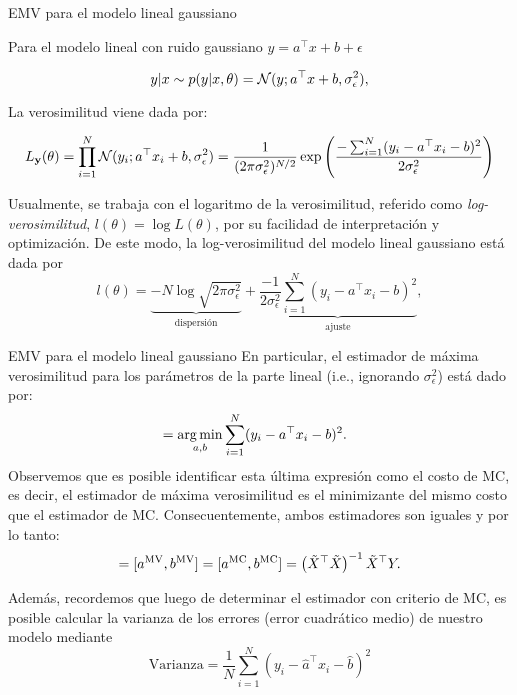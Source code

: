\documentclass[9pt]{beamer}
\begin{document}
\begin{frame}{EMV para el modelo lineal gaussiano}

Para el modelo lineal con ruido gaussiano $y=a^\top x + b + \epsilon$

\begin{equation*}
	y|x \sim p(y|x,\theta) = {\mathcal N}(y;a^\top x + b ,\sigma_\epsilon^2),\label{eq:mod_lin_gau}
\end{equation*}

La verosimilitud viene dada por:

\begin{equation*}
	L_{\mathbf{y}}(\theta) =  \prod_{i=1}^N {\mathcal N}(y_i;a^\top x_i + b,\sigma_\epsilon^2) = \frac{1}{(2\pi\sigma_\epsilon^2)^{N/2}}  \exp\left(\frac{-\sum_{i=1}^N(y_i-a^\top x_i - b)^2}{2\sigma_\epsilon^2}\right) \label{eq:verosimilitud_lineal}
\end{equation*}\pause

Usualmente, se trabaja con el logaritmo de la verosimilitud, referido como \emph{log-verosimilitud}, $l(\theta) = \log L(\theta)$, por su facilidad de interpretación y optimización. De este modo, la log-verosimilitud del modelo lineal gaussiano está dada por
\begin{equation*}
	l(\theta) 
		= \underbrace{-N\log \sqrt{2\pi\sigma^2_\epsilon}}_{\text{dispersión}} + \underbrace{\frac{-1}{2\sigma_\epsilon^2} \sum_{i=1}^N (y_i-a^\top x_i - b)^2}_{\text{ajuste}},
\end{equation*}
	
\end{frame}

\begin{frame}{EMV para el modelo lineal gaussiano}
	En particular, el estimador  de máxima verosimilitud para los parámetros de  la parte lineal (i.e., ignorando $\sigma^2_\epsilon$) está dado por:
\begin{align*}
	 [a^{\text{MV}} ,b^{\text{MV}} ]
						&= \argmin_{a,b} \sum_{i=1}^N (y_i-a^\top x_i - b)^2. \label{eq:theta_ML}
\end{align*}\pause
Observemos que es posible identificar esta última expresión como el costo de MC, es decir, el estimador de máxima verosimilitud es el minimizante del mismo costo que el estimador de MC. Consecuentemente, ambos estimadores son iguales y por lo tanto:
\begin{equation*}
	 [\hat{a},\hat{b}] = [a^{\text{MV}} ,b^{\text{MV}} ]=[a^{\text{MC}} ,b^{\text{MC}} ] = \left(\tX^\top\tX\right)^{-1} \tX^\top Y.
\end{equation*}\pause

Además, recordemos que luego de determinar el estimador con criterio de MC, es posible calcular la varianza de los errores (error cuadrático medio) de nuestro modelo mediante 
\begin{equation*}
	\text{Varianza} = \frac{1}{N}\sum_{i=1}^N (y_i-\hat{a}^\top x_i -\hat{b})^2
\end{equation*}

\end{frame}
\end{document}
